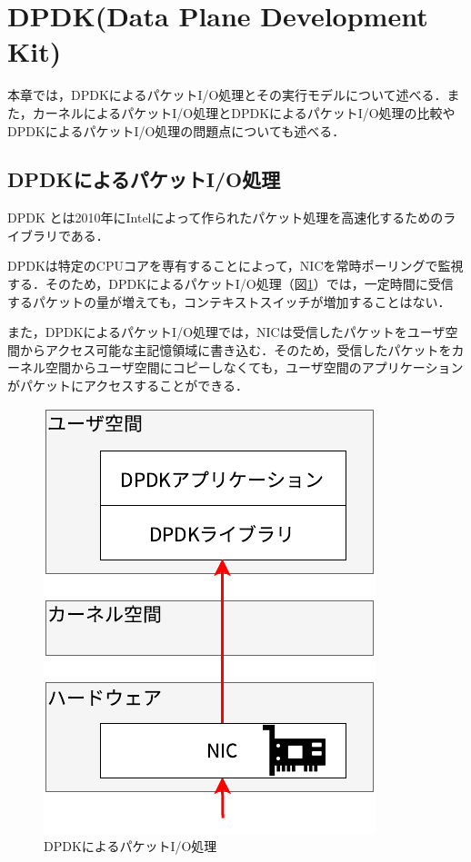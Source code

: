 \section{DPDK(Data Plane Development Kit)}
\label{sec:DPDK}
本章では，DPDKによるパケットI/O処理とその実行モデルについて述べる．また，カーネルによるパケットI/O処理とDPDKによるパケットI/O処理の比較やDPDKによるパケットI/O処理の問題点についても述べる．

\subsection{DPDKによるパケットI/O処理}
DPDK \cite{DPDK} とは2010年にIntelによって作られたパケット処理を高速化するためのライブラリである．

DPDKは特定のCPUコアを専有することによって，NICを常時ポーリングで監視する．そのため，DPDKによるパケットI/O処理（図\ref{fig:DPDKPacketIO}）では，一定時間に受信するパケットの量が増えても，コンテキストスイッチが増加することはない．

また，DPDKによるパケットI/O処理では，NICは受信したパケットをユーザ空間からアクセス可能な主記憶領域に書き込む．そのため，受信したパケットをカーネル空間からユーザ空間にコピーしなくても，ユーザ空間のアプリケーションがパケットにアクセスすることができる．

\begin{figure}[htb]
  \centering
  \includegraphics[width=0.5\columnwidth]{pictures/DPDKPacketIO.pdf}
  \caption{DPDKによるパケットI/O処理}
  \label{fig:DPDKPacketIO}
\end{figure}

